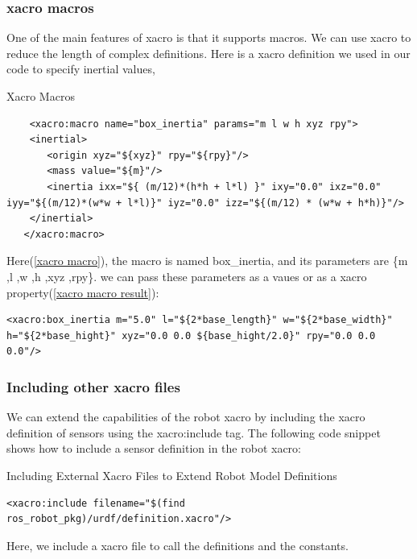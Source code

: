 \documentclass[../../main]{subfiles}
\begin{document}
\subsubsection{xacro macros}
One of the main features of xacro is that it supports macros. We can use xacro to reduce
the length of complex definitions. Here is a xacro definition we used in our code to
specify inertial values,
\begin{codebox}[label=xacro macro]{Xacro Macros}
  \begin{verbatim}
    <xacro:macro name="box_inertia" params="m l w h xyz rpy">
    <inertial>
       <origin xyz="${xyz}" rpy="${rpy}"/>
       <mass value="${m}"/>
       <inertia ixx="${ (m/12)*(h*h + l*l) }" ixy="0.0" ixz="0.0" iyy="${(m/12)*(w*w + l*l)}" iyz="0.0" izz="${(m/12) * (w*w + h*h)}"/>
    </inertial>
   </xacro:macro>
\end{verbatim}
\end{codebox}
Here(\cref{xacro macro}), the macro is named box\_inertia, and its parameters are \{m ,l ,w ,h ,xyz ,rpy\}. we can pass these parameters as a vaues or as a xacro property(\cref{xacro macro result}):
\begin{codebox}[label=xacro macro result]{}
  \begin{verbatim}
<xacro:box_inertia m="5.0" l="${2*base_length}" w="${2*base_width}" h="${2*base_hight}" xyz="0.0 0.0 ${base_hight/2.0}" rpy="0.0 0.0 0.0"/>
\end{verbatim}
  \end{codebox}

\subsubsection{Including other xacro files}
We can extend the capabilities of the robot xacro by including the xacro definition of
sensors using the xacro:include tag. The following code snippet shows how to include
a sensor definition in the robot xacro:
\begin{codebox}[]{Including External Xacro Files to Extend Robot Model Definitions}
  \begin{verbatim}
<xacro:include filename="$(find ros_robot_pkg)/urdf/definition.xacro"/>
\end{verbatim}
  \end{codebox}
Here, we include a xacro file to call the definitions and the constants. 
\newpage
\end{document}
